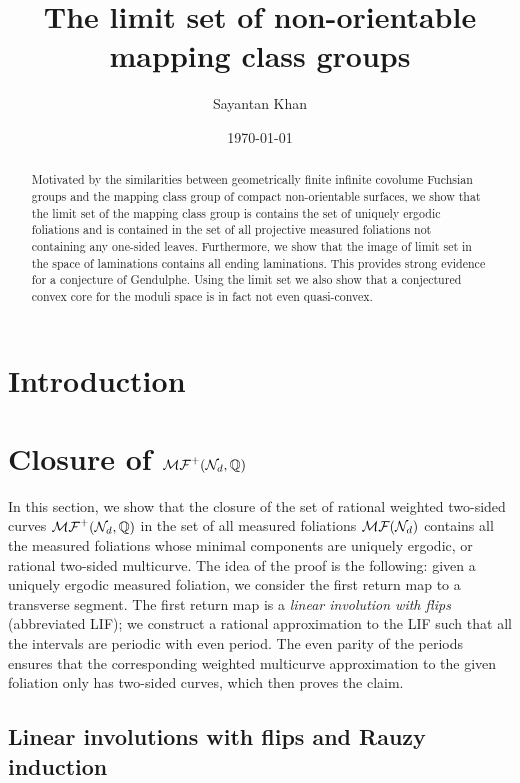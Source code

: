 \documentclass[12pt, reqno]{amsart}
\title{The limit set of non-orientable mapping class groups}
\author{Sayantan Khan}
\date{\today}
\begin{document}
\maketitle
\begin{abstract}
  Motivated by the similarities between geometrically finite infinite covolume Fuchsian groups and the mapping class group of compact non-orientable surfaces, we show that the limit set of the mapping class group is contains the set of uniquely ergodic foliations and is contained in the set of all projective measured foliations not containing any one-sided leaves.
  Furthermore, we show that the image of limit set in the space of laminations contains all ending laminations.
  This provides strong evidence for a conjecture of Gendulphe.
  Using the limit set we also show that a conjectured convex core for the moduli space is in fact not even quasi-convex.
\end{abstract}
\tableofcontents

\section{Introduction}
\label{sec:introduction}

\section{Closure of $\mathcal{MF}^+(\mathcal{N}_d, \mathbb{Q})$}
\label{sec:closure-mf}

In this section, we show that the closure of the set of rational weighted two-sided curves $\mathcal{MF}^+(\mathcal{N}_d, \mathbb{Q})$ in the set of all measured foliations $\mathcal{MF}(\mathcal{N}_d)$ contains all the measured foliations whose minimal components are uniquely ergodic, or rational two-sided multicurve.
The idea of the proof is the following: given a uniquely ergodic measured foliation, we consider the first return map to a transverse segment.
The first return map is a \emph{linear involution with flips} (abbreviated LIF); we construct a rational approximation to the LIF such that all the intervals are periodic with even period.
The even parity of the periods ensures that the corresponding weighted multicurve approximation to the given foliation only has two-sided curves, which then proves the claim.

\subsection*{Linear involutions with flips and Rauzy induction}
\end{document}
